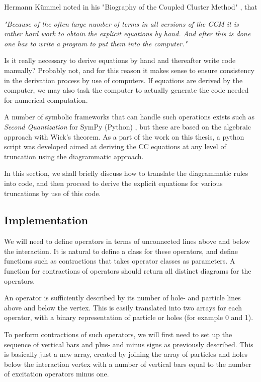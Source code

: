 Hermann Kümmel noted in his "Biography of the Coupled Cluster Method"
\cite{Kummel}, that

\emph{"Because of the often large number of terms in all versions of the CCM it is rather hard work to obtain the explicit equations by hand. And after this is done one has to write a program to put them into the computer."}

Is it really necessary to derive equations by hand and thereafter
write code manually? Probably not, and for this reason it makes sense
to ensure consistency in the derivation process by use of
computers. If equations are derived by the computer, we may also task
the computer to actually generate the code needed for numerical
computation.

A number of symbolic frameworks that can handle such operations
exists such as \emph{Second Quantization} for SymPy (Python)
\cite{secondquant}, but these are based on the algebraic approach with
Wick's theorem. As a part of the work on this thesis, a python script
was developed aimed at deriving the CC equations at any level of truncation
using the diagrammatic approach.

In this section, we shall briefly discuss how to translate the
diagrammatic rules into code, and then proceed to derive the explicit
equations for various truncations by use of this code.

\subsection{Implementation}

We will need to define operators in terms of unconnected lines above
and below the interaction. It is natural to define a class for these
operators, and define functions such as contractions that takes
operator classes as parameters. A function for contractions of
operators should return all distinct diagrams for the operators.

An operator is sufficiently described by its number of hole- and
particle lines above and below the vertex. This is easily translated
into two arrays for each operator, with a binary representation of
particle or holes (for example 0 and 1).

To perform contractions of such operators, we will first need to set
up the sequence of vertical bars and plus- and minus signs as
previously described. This is basically just a new array, created by
joining the array of particles and holes below the interaction vertex
with a number of vertical bars equal to the number of excitation
operators minus one.

